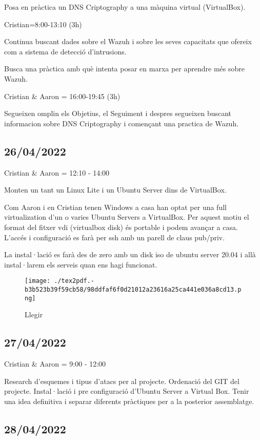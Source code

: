 \documentclass[]{article}
\begin{document}
Posa en pràctica un DNS Criptography a una màquina virtual (VirtualBox).

Cristian=8:00-13:10 (3h)

Continua buscant dades sobre el Wazuh i sobre les seves capacitats que
ofereix com a sistema de detecció d'intrusions.

Busca una pràctica amb què intenta posar en marxa per aprendre més sobre
Wazuh.

Cristian \& Aaron = 16:00-19:45 (3h)

Segueixen omplin els Objetius, el Seguiment i despres segueixen buscant
informacion sobre DNS Criptography i començant una practica de Wazuh.

\hypertarget{section-3}{%
\subsection{26/04/2022}\label{section-3}}

Cristian \& Aaron = 12:10 - 14:00

Monten un tant un Linux Lite i un Ubuntu Server dins de VirtualBox.

Com Aaron i en Cristian tenen Windows a casa han optat per una full
virtualization d'un o varies Ubuntu Servers a VirtualBox. Per aquest
motiu el format del fitxer vdi (virtualbox disk) és portable i podem
avançar a casa. L'accés i configuració es farà per ssh amb un parell de
claus pub/priv.

La instal·lació es farà des de zero amb un disk iso de ubuntu server
20.04 i allà instal·larem els serveis quan ens hagi funcionat.

\begin{figure}
\centering
\texttt{[image: ./tex2pdf.-b3b523b39f59cb58/98ddfaf6f0d21012a23616a25ca441e036a8cd13.png]}
\caption{Llegir}
\end{figure}

\hypertarget{section-4}{%
\subsection{27/04/2022}\label{section-4}}

Cristian \& Aaron = 9:00 - 12:00

Research d'esquemes i tipus d'atacs per al projecte. Ordenació del GIT
del projecte. Instal·lació i pre configuració d'Ubuntu Server a Virtual
Box. Tenir una idea definitiva i separar diferents pràctiques per a la
posterior assemblatge.

\hypertarget{section-5}{%
\subsection{28/04/2022}\label{section-5}}
\end{document}
